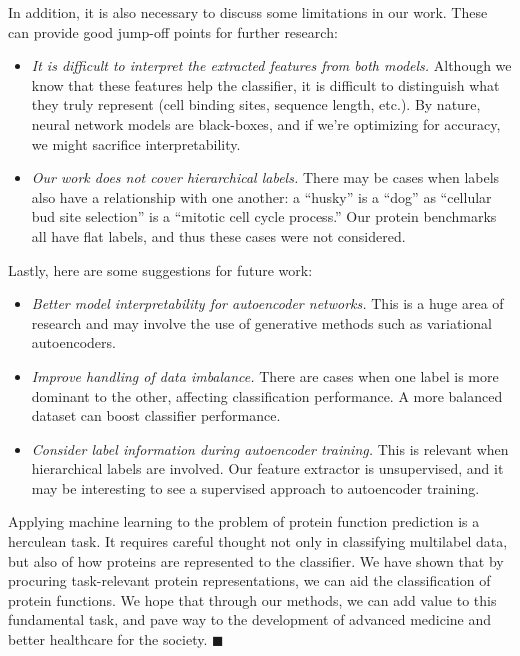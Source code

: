 \par In addition, it is also necessary to discuss some limitations in our work.
These can provide good jump-off points for further research:
\begin{itemize}
    \item \textit{It is difficult to interpret the extracted features from both
        models.} Although we know that these features help the classifier, it
        is difficult to distinguish what they truly represent (cell binding
        sites, sequence length, etc.). By nature, neural network models are
        black-boxes, and if we're optimizing for accuracy, we might sacrifice
        interpretability.
    \item \textit{Our work does not cover hierarchical labels.} There may be
        cases when labels also have a relationship with one another: a
        ``husky'' is a ``dog'' as ``cellular bud site selection'' is a
        ``mitotic cell cycle process.'' Our protein benchmarks all have flat
        labels, and thus these cases were not considered. 
\end{itemize}

\par Lastly, here are some suggestions for future work:
\begin{itemize}
    \item \textit{Better model interpretability for autoencoder networks.} This
        is a huge area of research and may involve the use of generative
        methods such as variational autoencoders.
    \item \textit{Improve handling of data imbalance.} There are cases when one
        label is more dominant to the other, affecting classification
        performance. A more balanced dataset can boost classifier performance.
    \item \textit{Consider label information during autoencoder training.} This
        is relevant when hierarchical labels are involved. Our feature
        extractor is unsupervised, and it may be interesting to see a
        supervised approach to autoencoder training.
\end{itemize}

\par Applying machine learning to the problem of protein function prediction is
a herculean task. It requires careful thought not only in classifying
multilabel data, but also of how proteins are represented to the classifier.
We have shown that by procuring task-relevant protein representations, we can
aid the classification of protein functions. We hope that through our methods,
we can add value to this fundamental task, and pave way to the development of
advanced medicine and better healthcare for the society. $\blacksquare$

